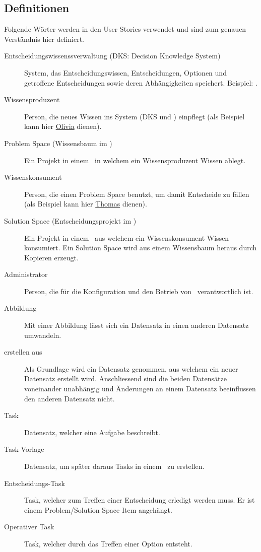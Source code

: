 	\subsection{Definitionen}\label{userstoryDefinitions}
		Folgende Wörter werden in den User Stories verwendet und sind zum genauen Verständnis hier definiert.
		\begin{description}			
			\item[Entscheidungswissenssverwaltung (DKS: Decision Knowledge System)] System, 
				das Entscheidungswissen, Entscheidungen, Optionen und getroffene Entscheidungen 
				sowie deren Abhängigkeiten speichert. Beispiel: \cdar.
			\item[Wissensproduzent] Person, die neues Wissen ins System (DKS und \eeppi)
				 einpflegt (als Beispiel kann hier \hyperref[olivia]{Olivia} dienen).
			\item[Problem Space (Wissensbaum im \cdar)] Ein Projekt in einem \dks\, 
				in welchem ein Wissensproduzent Wissen ablegt.
			\item[Wissenskonsument] Person, die einen Problem Space benutzt,
				 um damit Entscheide zu fällen 
				 (als Beispiel kann hier \hyperref[thomas]{Thomas} dienen).
			\item[Solution Space (Entscheidungsprojekt im \cdar)] Ein Projekt in einem \dks\, 
				aus welchem ein Wissenskonsument Wissen konsumiert.
				Ein Solution Space wird aus einem Wissensbaum heraus durch Kopieren erzeugt.
			\item[Administrator] Person, die für die Konfiguration 
				und den Betrieb von \eeppi\ verantwortlich ist.
			\item[Abbildung] Mit einer Abbildung lässt sich ein Datensatz 
				in einen anderen Datensatz umwandeln.
			\item[erstellen aus] Als Grundlage wird ein Datensatz genommen, 
				aus welchem ein neuer Datensatz erstellt wird.
				Anschliessend sind die beiden Datensätze voneinander unabhängig 
				und Änderungen an einem Datensatz beeinflussen den anderen Datensatz nicht.
			\item[Task] Datensatz, welcher eine Aufgabe beschreibt.
			\item[Task-Vorlage] Datensatz, um später daraus Tasks in einem \ppt\ zu erstellen.
			\item[Entscheidungs-Task] Task, 
				welcher zum Treffen einer Entscheidung erledigt werden muss.
				Er ist einem Problem/Solution Space Item angehängt.
			\item[Operativer Task] Task, welcher durch das Treffen einer Option entsteht.

\end{description}
